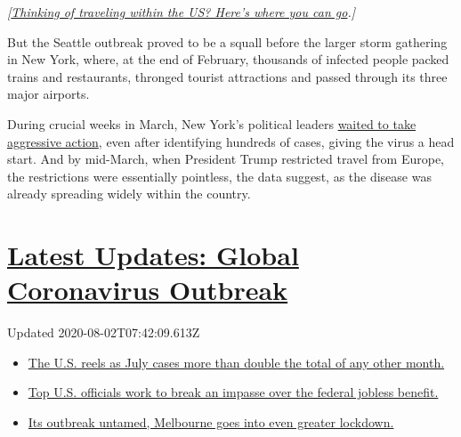 \emph{{[}}\href{https://www.nytimes.com/2020/07/10/travel/state-travel-restrictions.html}{\emph{Thinking
of traveling within the US? Here's where you can go}}\emph{.{]}}

But the Seattle outbreak proved to be a squall before the larger storm
gathering in New York, where, at the end of February, thousands of
infected people packed trains and restaurants, thronged tourist
attractions and passed through its three major airports.

During crucial weeks in March, New York's political leaders
\href{https://www.nytimes.com/2020/04/08/nyregion/new-york-coronavirus-response-delays.html}{waited
to take aggressive action}, even after identifying hundreds of cases,
giving the virus a head start. And by mid-March, when President Trump
restricted travel from Europe, the restrictions were essentially
pointless, the data suggest, as the disease was already spreading widely
within the country.

\hypertarget{latest-updates-global-coronavirus-outbreak}{%
\section{\texorpdfstring{\href{https://www.nytimes.com/2020/08/01/world/coronavirus-covid-19.html?action=click\&pgtype=Article\&state=default\&region=MAIN_CONTENT_1\&context=storylines_live_updates}{Latest
Updates: Global Coronavirus
Outbreak}}{Latest Updates: Global Coronavirus Outbreak}}\label{latest-updates-global-coronavirus-outbreak}}

Updated 2020-08-02T07:42:09.613Z

\begin{itemize}
\tightlist
\item
  \href{https://www.nytimes.com/2020/08/01/world/coronavirus-covid-19.html?action=click\&pgtype=Article\&state=default\&region=MAIN_CONTENT_1\&context=storylines_live_updates\#link-34047410}{The
  U.S. reels as July cases more than double the total of any other
  month.}
\item
  \href{https://www.nytimes.com/2020/08/01/world/coronavirus-covid-19.html?action=click\&pgtype=Article\&state=default\&region=MAIN_CONTENT_1\&context=storylines_live_updates\#link-780ec966}{Top
  U.S. officials work to break an impasse over the federal jobless
  benefit.}
\item
  \href{https://www.nytimes.com/2020/08/01/world/coronavirus-covid-19.html?action=click\&pgtype=Article\&state=default\&region=MAIN_CONTENT_1\&context=storylines_live_updates\#link-2bc8948}{Its
  outbreak untamed, Melbourne goes into even greater lockdown.}
\end{itemize}

